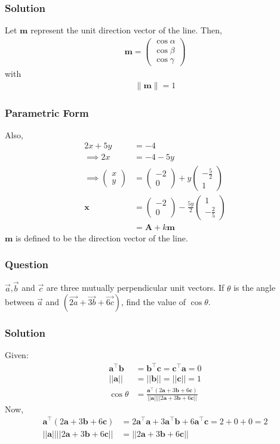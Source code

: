 \documentclass{beamer}
\providecommand{\brak}[1]{\ensuremath{\left(#1\right)}}
\theoremstyle{remark}
\providecommand{\norm}[1]{\lVert#1\rVert}
\newcommand{\myvec}[1]{\ensuremath{\begin{pmatrix}#1\end{pmatrix}}}
\let\vec\mathbf
\begin{document}
%
\begin{frame}
\frametitle{Solution}
Let $\vec{m}$ represent the unit direction vector of the line.  Then,
\begin{align}
    \vec{m} = \myvec{
        \cos{\alpha} \\
        \cos{\beta}\\
        \cos{\gamma}
    }
\end{align}
with 
\begin{align}
	\norm{\vec{m}} =  1
\end{align}
\end{frame}
%
\begin{frame}
\frametitle{Parametric Form}
Also, 
\begin{align}
    2x + 5y &= -4\\
    \implies 2x &= -4 -5y
    \\
    \implies
    \myvec{
        x\\
        y
    } &= \myvec{
        -2\\
        0
    } + y\myvec{
        -\frac{5}{2}\\
        1
    }\\
    \vec{x} &= \myvec{
        -2\\
        0
    } -\frac{5y}{2}\myvec{
        1\\
        -\frac{2}{5}
    }\\
    &= \vec{A} + k\vec{m} 
  \label{eq:line_dir_pt-lam}
\end{align}
$\vec{m}$ is defined to be the direction vector of the line.
\end{frame}
%
\begin{frame}
\frametitle{Question }
$\overrightarrow{a}$,$\overrightarrow{b}$ and $\overrightarrow{c}$ are three mutually perpendicular unit vectors. If $\theta$ is the angle between $\overrightarrow{a}$ and $\brak{\overrightarrow{2a}+\overrightarrow{3b}+\overrightarrow{6c}}$, find the value of $\cos{\theta}$. 
\end{frame}
%
\begin{frame}
\frametitle{Solution}
Given:
\begin{align}
    \vec{a}^{\top}\vec{b} &=  \vec{b}^{\top}\vec{c} =  \vec{c}^{\top}\vec{a} = 0\\
    \lvert \lvert \vec{a} \rvert \rvert 
&= \lvert \lvert \vec{b} \rvert \rvert = \lvert \lvert \vec{c} \rvert \rvert = 1\\
\cos{\theta} &= \frac{\vec{a}^{\top}\brak{2\vec{a}+3\vec{b}+6\vec{c}}}{\lvert \lvert \vec{a} \rvert \rvert \lvert \lvert 2\vec{a} + 3\vec{b} + 6\vec{c} \rvert \rvert}
\end{align}
Now,
\begin{align}
    \vec{a}^{\top}\brak{2\vec{a}+3\vec{b}+6\vec{c}} &= 2\vec{a}^{\top}\vec{a} + 3\vec{a}^{\top}\vec{b} + 6\vec{a}^{\top}\vec{c} = 2 + 0 + 0 = 2\\
    \lvert \lvert \vec{a} \rvert \rvert \lvert \lvert 2\vec{a} + 3\vec{b} + 6\vec{c} \rvert \rvert &= \lvert \lvert 2\vec{a} + 3\vec{b} + 6\vec{c} \rvert \rvert
    \end{align}
\end{frame}
\end{document}
